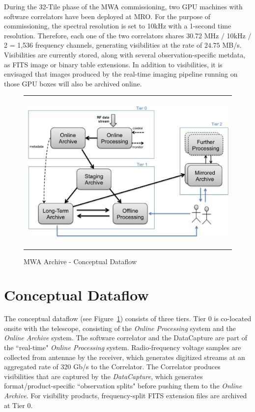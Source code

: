During the 32-Tile phase of the MWA commissioning, two GPU machines with software correlators have been deployed at MRO. For the purpose of commissioning, the spectral resolution is set to 10kHz with a 1-second time resolution. Therefore, each one of the two correlators shares 30.72 MHz \(/\) 10kHz \(/\) 2 = 1,536 frequency channels, generating visibilities at the rate of \(24.75\) MB/s. Visibilities are currently stored, along with several observation-specific metdata, as FITS image or binary table extensions. In addition to visibilities, it is envisaged that images produced by the real-time imaging pipeline \citep{ord2010interferometric} running on those GPU boxes will also be archived online.

   \begin{figure}
   \begin{center}
   \begin{tabular}{c}
   \includegraphics[height=8cm]{part6/Wu_P34/P34_f1.eps}
   \end{tabular}
   \end{center}
   \caption[example] 

   { \label{fig:con_dataflow} 
MWA Archive - Conceptual Dataflow}
   \end{figure} 

\section{Conceptual Dataflow}
The conceptual dataflow (see Figure~\ref{fig:con_dataflow}) consists of three tiers. Tier 0 is co-located onsite with the telescope, consisting of the \emph{Online Processing} system and the \emph{Online Archive} system. The software correlator and the DataCapture are part of the ``real-time" \emph{Online Processing} system. Radio-frequency voltage samples are collected from antennae by the receiver, which generates digitized streams at an aggregated rate of 320 Gb/s to the Correlator. The Correlator produces visibilities that are captured by the \emph{DataCapture}, which generates format/product-specific ``observation splits" before pushing them to the \emph{Online Archive}. For visibility products, frequency-split FITS extension files are archived at Tier 0.

